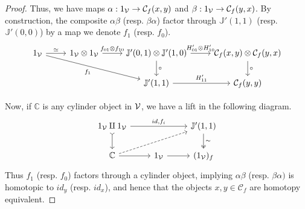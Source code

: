 \documentclass[a4paper,10pt
,draft
]{article}%
\newcommand{\J}{\mathbb J}
\renewcommand{\1}{\ensuremath{\mathbb{id}}}
\begin{document}
\begin{proof}
      Thus, we have maps $\alpha: 1_{\mathcal V} \to \mathcal C_f(x,y)$ and $\beta: 1_{\mathcal V} \to \mathcal C_f(y,x)$.
      By construction, the composite $\alpha\beta$ (resp. $\beta\alpha$) factor through $\J'(1,1)$ (resp. $\J'(0,0)$)
      by a map we denote $f_1$ (resp. $f_0$).
      \begin{equation}
            \begin{tikzcd}
                  1_\V \arrow[r, "\simeq"] \arrow[drr, "f_1"']
                  &
                  1_\V \otimes 1_\V \arrow[r, "f_{01} \otimes f_{10}"]
                  &
                  \J'(0,1) \otimes \J'(1,0) \arrow[d, "\circ"] \arrow[r, "H'_{01} \otimes H'_{10}"]
                  &
                  \mathcal C_f(x,y) \otimes \mathcal C_f(y,x) \arrow[d, "\circ"]
                  \\
                  &&
                  \J'(1,1) \arrow[r, "H'_{11}"]
                  &
                  \mathcal C_f(y,y)
            \end{tikzcd}
      \end{equation}
      
      Now, if $\mathbb C$ is any cylinder object in $\mathcal V$, we have a lift in the following diagram.
      \begin{equation}
            \label{J11_CYL_EQ}
            \begin{tikzcd}
                  1_\V \amalg 1_\V \arrow[rr, "{id, f_i}"] \arrow[d, tail]
                  &&
                  \J'(1,1) \arrow[d, "\sim", two heads]
                  \\
                  \mathbb C \arrow[r] \arrow[urr, dashed]
                  &
                  1_\V \arrow[r]
                  &
                  (1_\V)_f
              \end{tikzcd}
        \end{equation}
        Thus $f_1$ (resp. $f_0$) factors through a cylinder object,
        implying $\alpha\beta$ (resp. $\beta\alpha)$ is homotopic to $id_y$ (resp. $id_x$),
        and hence that the objects $x,y\in \mathcal C_f$ are homotopy equivalent.
  \end{proof}
  
\end{document}

